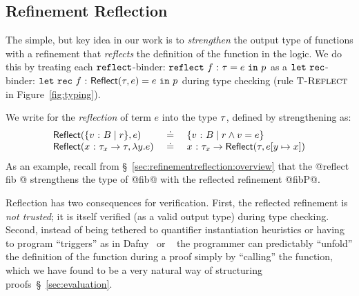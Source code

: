 
\subsection{Refinement Reflection}
\label{subsec:logicalannotations}
%
The simple, but key idea in our work is to
\emph{strengthen} the output type of functions
with a refinement that \emph{reflects} the
definition of the function in the logic.
%
We do this by treating each
%
$\mathtt{reflect}$-binder:
%
${{\mathtt{reflect}}\ {f} \ \text{:}\ {\tau} = e\ \mathtt{in}\ {p}}$
%
as a $\mathtt{let\ rec}$-binder:
%
${{\mathtt{let\ rec}}\ {f} \ \text{:}\ {\mathsf{Reflect}(\tau, e)} = e\ \mathtt{in}\ {p}}$
%
during type checking (rule $\textsc{T-Reflect}$ in Figure~\ref{fig:typing}).

%
We write  for the \emph{reflection}
of term $e$ into the type $\tau$,  defined by strengthening
\typ as:
%
$$
\begin{array}{lcl}
\mathsf{Reflect}(\{ {v} \ \text{:}\ {B} \mid r \}, e)
  & \ \doteq\ 
  & \{ {v} \ \text{:}\ {B} \mid r \land v = e \}\\
\mathsf{Reflect}({x} \ \text{:}\ {\tau_x} \rightarrow \tau, \lambda y. e)
  & \ \doteq\ 
  & {x} \ \text{:}\ {\tau_x} \rightarrow \mathsf{Reflect}(\tau, e[{{y} \mapsto {x}}])
\end{array}
$$
%
As an example, recall from \S~\ref{sec:refinementreflection:overview}
that the @reflect fib @ strengthens the type of
@fib@ with the reflected refinement @fibP@.


%
Reflection has two consequences for verification.
%
First, the reflected refinement is \emph{not trusted};
it is itself verified (as a valid output type)
during type checking.
%
Second, instead of being tethered to quantifier
instantiation heuristics or having to program
``triggers'' as in Dafny~\citep{dafny} or
\fstar~\citep{fstar}
%
the programmer can predictably ``unfold'' the
definition of the function during a proof simply
by ``calling'' the function, which we have found
to be a very natural way of structuring
proofs~\S~\ref{sec:evaluation}.


